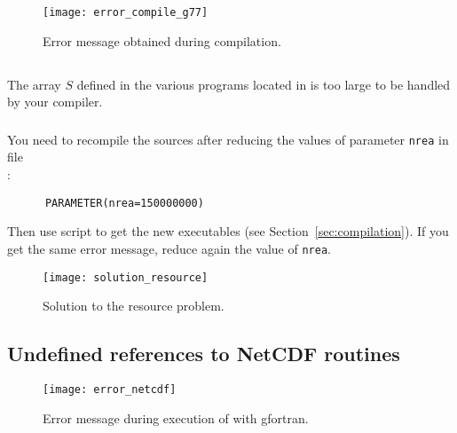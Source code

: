 \begin{figure}[htpb]
\centering
\texttt{[image: error\_compile\_g77]}
\caption{Error message obtained during compilation. \label{fig:error_compile}}
\end{figure}

\subsection{\question}

The array $S$ defined in the various programs located in  is too large to be handled by your compiler. 


\subsubsection{\answer}

You need to recompile the sources after reducing the values of parameter \texttt{nrea} in file\\
 :
\begin{verbatim}
      PARAMETER(nrea=150000000)
\end{verbatim}
Then use script  to get the new executables (see Section~\ref{sec:compilation}). If you get the same error message, reduce again the value of \texttt{nrea}.

\begin{figure}[htpb]
\centering
\texttt{[image: solution\_resource]}
\caption{Solution to the resource problem.}
\end{figure}


\subsection{Undefined references to NetCDF routines\label{sec:error_netcdf}}

\begin{figure}[htpb]
\centering
\texttt{[image: error\_netcdf]}
\caption{Error message during execution of  with gfortran\label{fig:error_netcdf}.}
\end{figure}

\subsubsection{\question}

